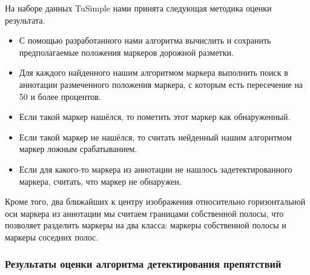 \documentclass[aps,%
14pt,%
final,%
oneside,
onecolumn,%
musixtex, %
superscriptaddress,%
centertags]{extarticle} %
\begin{document}
На наборе данных TuSimple нами принята следующая методика оценки результата.

\begin{itemize}
\item С помощью разработанного нами алгоритма вычислить и сохранить предполагаемые положения маркеров дорожной разметки.
\item Для каждого найденного нашим алгоритмом маркера выполнить поиск в аннотации размеченного положения маркера, с которым есть пересечение на 50 и более процентов.
\item Если такой маркер нашёлся, то пометить этот маркер как обнаруженный.
\item Если такой маркер не нашёлся, то считать нейденный нашим алгоритмом маркер ложным срабатыванием.
\item Если для какого-то маркера из аннотации не нашлось задетектированного маркера, считать, что маркер не обнаружен.
\end{itemize}

Кроме того, два ближайших к центру изображения относительно горизонтальной оси маркера из аннотации мы считаем границами собственной полосы, что позволяет разделить маркеры на два класса: маркеры собственной полосы и маркеры соседних полос.

\subsubsection{Результаты оценки алгоритма детектирования препятствий}
\end{document}
